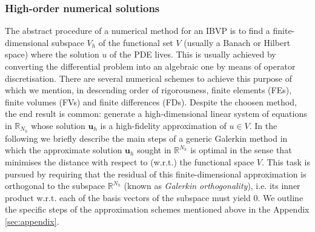 \documentclass[../main.tex]{subfiles}
\begin{document}
\subsubsection{High-order numerical solutions}\label{subsubsec:numerical}

The abstract procedure of a numerical method for an IBVP is to find a finite-dimensional subspace $V_{h}$ of the functional set $V$ (usually a Banach or Hilbert space) where the solution $u$ of the PDE lives.
This is usually achieved by converting the differential problem into an algebraic one by means of operator discretisation.
There are several numerical schemes to achieve this purpose of which we mention, in descending order of rigorousness, finite elements (FEs), finite volumes (FVs) and finite differences (FDs).
Despite the choosen method, the end result is common: generate a high-dimensional linear system of equations in $\mathbb{R}_{N_{h}}$ whose solution $\boldsymbol{u}_{h}$ is a high-fidelity approximation of $u\in V$.
In the following we briefly describe the main steps of a generic Galerkin method in which the approximate solution $\boldsymbol{u}_{h}$ sought in $\mathbb{R}^{N_{h}}$ is optimal in the sense that minimises the distance with respect to (w.r.t.) the functional space $V$.
This task is pursued by requiring that the residual of this finite-dimensional approximation is orthogonal to the subspace $\mathbb{R}^{N_{h}}$ (known as \textit{Galerkin orthogonality}), i.e. its inner product w.r.t. each of the basis vectors of the subspace must yield $0$.
We outline the specific steps of the approximation schemes mentioned above in the Appendix \ref{sec:appendix}.



\end{document}
